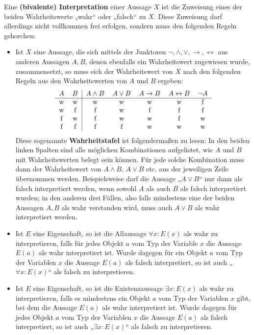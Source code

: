 \begin{de}[Interpretation] \label{def:interpretation}  
    Eine \textbf{(bivalente) Interpretation} einer Aussage $X$ ist die Zuweisung eines der beiden Wahrheitswerte „wahr“ oder „falsch“ zu $X$. Diese Zuweisung darf allerdings nicht vollkommen frei erfolgen, sondern muss den folgenden Regeln gehorchen:
    \begin{itemize}
        \item  Ist $X$ eine Aussage, die sich mittels der Junktoren $\neg,\land,\lor,\to,\leftrightarrow$ aus anderen Aussagen $A,B$, denen ebenfalls ein Wahrheitswert zugewiesen wurde, zusammensetzt, so muss sich der Wahrheitswert von $X$ nach den folgenden Regeln aus den Wahrheitswerten von $A$ und $B$ ergeben:
        \[\begin{tabular}{cc|ccccc}
            $A$ & $B$  & $A\land B$ & $A\lor B$ & $A\to B$ & $A\leftrightarrow B$ & $\neg A$ \\
            \hline
            w&w&w & w & w & w & f\\
            w&f&f & w & f & f & f\\
            f&w&f & w & w & f & w\\
            f&f&f & f & w & w & w\\
        \end{tabular}\]
        Diese sogenannte \textbf{Wahrheitstafel} ist folgendermaßen zu lesen: In den beiden linken Spalten sind alle möglichen Kombinationen aufgelistet, wie $A$ und $B$ mit Wahrheitswerten belegt sein können. Für jede solche Kombination muss dann der Wahrheitswert von $A\land B$, $A\lor B$ etc. aus der jeweiligen Zeile übernommen werden. Beispielsweise darf die Aussage „$A\lor B$“ nur dann als falsch interpretiert werden, wenn sowohl $A$ als auch $B$ als falsch interpretiert wurden; in den anderen drei Fällen, also falls mindestens eine der beiden Aussagen $A,B$ als wahr verstanden wird, muss auch $A\lor B$ als wahr interpretiert werden.
        \item Ist $E$ eine Eigenschaft, so ist die Allaussage $\forall x: E(x)$ als wahr zu interpretieren, falls für jedes Objekt $a$ vom Typ der Variable $x$ die Aussage $E(a)$ als wahr interpretiert ist. Wurde dagegen für ein Objekt $a$ vom Typ der Variablen $x$ die Aussage $E(a)$ als falsch interpretiert, so ist auch „$\forall x: E(x)$“ als falsch zu interpretieren.
        \item Ist $E$ eine Eigenschaft, so ist die Existenzaussage $\exists x: E(x)$ als wahr zu interpretieren, falls es mindestens ein Objekt $a$ vom Typ der Variablen $x$ gibt, bei dem die Aussage $E(a)$ als wahr interpretiert ist. Wurde dagegen für jedes Objekt $a$ vom Typ der Variablen $x$ die Aussage $E(a)$ als falsch interpretiert, so ist auch „$\exists x: E(x)$“ als falsch zu interpretieren.
    \end{itemize}
\end{de}


